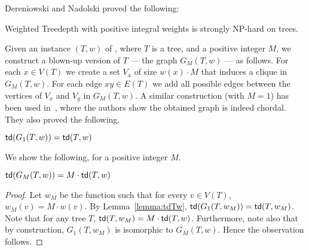 \documentclass[a4paper,11pt]{article}
\begin{document}
Dereniowski and Nadolski proved the following:
%
\begin{theorem}\label{thm:wtdisHard}
    {\sc Weighted Treedepth} with positive integral weights is strongly NP-hard on trees. 
\end{theorem}

Given an instance $(T,w)$ of , where $T$ is a tree, and a positive integer $M$, we construct a blown-up version of $T$ --- the graph $G_M(T,w)$ --- as follows. For each $x\in V(T)$ we create a set $V_x$ of size $w(x)\cdot M$ that induces a clique in $G_M(T,w)$. For each edge $xy\in E(T)$ we add all possible edges between the vertices of $V_x$ and $V_y$ in $G_M(T,w)$. A similar construction (with $M=1$) has been used in~\cite{ipl2006}, where the authors show the obtained graph is indeed chordal. 
They also proved the following.
%
\begin{lemma}\label{lemma:tdTw}
$\mathsf{td}(G_1(T,w))=\mathsf{td}(T,w)$
\end{lemma}

We show the following, for a positive integer $M$.
%
\begin{observation}\label{obs:tdMTw}
$\mathsf{td}(G_M(T,w))=M\cdot\mathsf{td}(T,w)$
\end{observation}
\begin{proof}
Let $w_M$ be the function such that for every $v\in V(T)$, $w_M(v)=M\cdot w(v)$. By Lemma~\ref{lemma:tdTw}, $\mathsf{td}(G_1(T,w_M))=\mathsf{td}(T,w_M)$. Note that for any tree $T$, $\mathsf{td}(T,w_M)=M\cdot \mathsf{td}(T,w)$. Furthermore, note also that by construction, $G_1(T,w_M)$ is isomorphic to $G_M(T,w)$. Hence the observation follows.
\end{proof}
\end{document}

